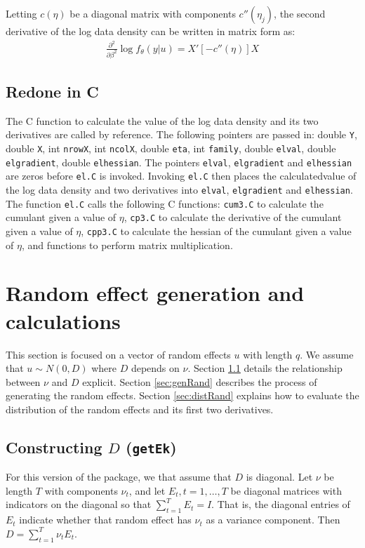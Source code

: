 \documentclass{article}
\begin{document}
Letting $ c(\eta)$ be a diagonal matrix with components $c''(\eta_j)$, the second derivative of the log data density can be written in matrix form as:
\begin{align}
   \frac{\partial^2}{\partial \beta^2} \log f_\theta(y|u) =   X' [ -  c''(\eta) ] X
\end{align}

\subsection{Redone in C}
The C function to calculate the value of the log data density and its two derivatives are called by reference. The following pointers are passed in: double \texttt{Y}, double \texttt{X}, int \texttt{nrowX}, int \texttt{ncolX}, double \texttt{eta}, int \texttt{family}, double \texttt{elval}, double \texttt{elgradient}, double \texttt{elhessian}. The pointers  \texttt{elval}, \texttt{elgradient} and \texttt{elhessian} are zeros before \texttt{el.C} is invoked. Invoking \texttt{el.C}  then places the calculatedvalue of the log data density and two derivatives into \texttt{elval}, \texttt{elgradient} and \texttt{elhessian}.\\

The function \texttt{el.C} calls the following C functions: \texttt{cum3.C} to calculate the cumulant given a value of $\eta$, \texttt{cp3.C} to calculate the derivative of the cumulant given a value of $\eta$, \texttt{cpp3.C} to calculate the hessian of the cumulant given a value of $\eta$, and functions to perform matrix multiplication.


\section{Random effect generation and calculations}
This section is focused on a vector of random effects $u$ with length $q$. We assume that $u \sim N(0,D)$ where $D$ depends on $\nu$. Section \ref{sec:getEk} details the  relationship between  $\nu$ and $D$ explicit. Section \ref{sec:genRand} describes the process of generating the random effects. Section \ref{sec:distRand} explains how to evaluate the distribution of the random effects and its first two derivatives.

\subsection{Constructing $D$ (\texttt{getEk})}\label{sec:getEk}
For this version of the package, we that assume that $D$ is diagonal.  Let $\nu$ be length $T$ with components $\nu_t$, and let $E_t,t=1,\ldots,T$ be diagonal matrices with indicators on the diagonal so that $\sum_{t=1}^T E_t = I$. That is, the diagonal entries  of $E_t$ indicate whether that random effect has $\nu_t$ as a variance component. Then $D=\sum_{t=1}^T\nu_t  E_t $.  
\end{document}
